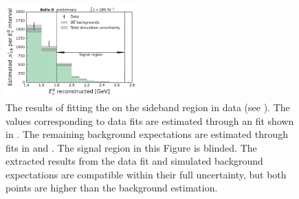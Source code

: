 \begin{figure}[htbp!]
    \centering
    \includegraphics[width=0.45\textwidth]{figures/data_validation/sidebands_background_vs_data.pdf}
    \caption{\label{fig:sidebands_background_versus_data} The results of fitting the \Mbc on the sideband region in data (see ).
    The values corresponding to data fits are estimated through an \Mbc fit shown in .
    The remaining \BB background expectations are estimated through \Mbc fits in  and .
    The signal region in this Figure is blinded.
    The extracted results from the data fit and simulated background expectations 
    are compatible within their full uncertainty, but both points are higher than the background estimation.
    }
\end{figure}

